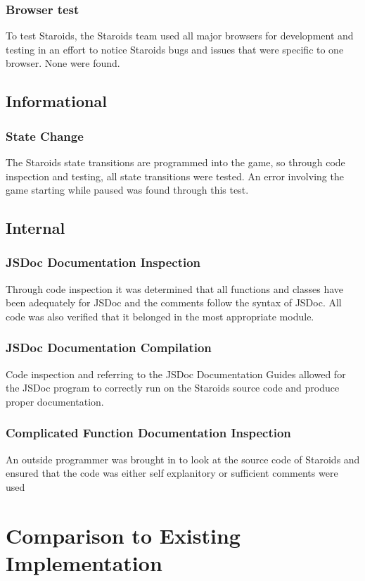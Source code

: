 \documentclass[12pt, titlepage]{article}
\begin{document}
\subsubsection{Browser test}
To test Staroids, the Staroids team used all major browsers for development and testing in an effort to notice Staroids bugs and issues that were specific to one browser. None were found.\\

\subsection{Informational}

\subsubsection{State Change}
The Staroids state transitions are programmed into the game, so through code inspection and testing, all state transitions were tested. An error involving the game starting while paused was found through this test.

\subsection{Internal}

\subsubsection{JSDoc Documentation Inspection}
Through code inspection it was determined that all functions and classes have been adequately for JSDoc and the comments follow the syntax of JSDoc. All code was also verified that it belonged in the most appropriate module.
\subsubsection{JSDoc Documentation Compilation}
Code inspection and referring to the JSDoc Documentation Guides allowed for the JSDoc program to correctly run on the Staroids source code and produce proper documentation.
\subsubsection{Complicated Function Documentation Inspection}
An outside programmer was brought in to look at the source code of Staroids and ensured that the code was either self explanitory or sufficient comments were used

\section{Comparison to Existing Implementation}
\end{document}
